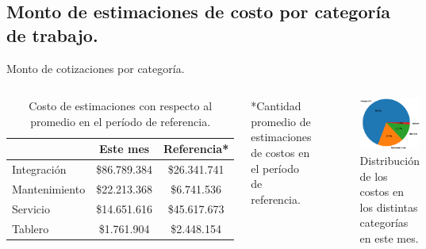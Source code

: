 \documentclass[aspectratio=169,xcolor=dvipsnames]{beamer}
\begin{document}
\subsection{Monto de estimaciones de costo por categoría de trabajo.}
\begin{frame}{Monto de cotizaciones por categoría.}
\begin{columns}[c] 
\begin{table}[h!]
\begin{tabular}{|l|c|c|}\hline
  \rowcolor{MediumBlue} \color{white} & \color{white}Este mes & \color{white}Referencia*  \\\hline
Integración & \$86.789.384 & \$26.341.741 \\
Mantenimiento &\$22.213.368 & \$6.741.536 \\
Servicio &  \$14.651.616 & \$45.617.673 \\
Tablero & \$1.761.904 & \$2.448.154\\\hline
\end{tabular}
\caption{Costo de estimaciones con respecto al promedio en el período de referencia.}
\label{table:costo_promedio_mensual}
\end{table}
\begin{block}{}
    \footnotesize{*Cantidad promedio de estimaciones de costos en el período de referencia.}
\end{block}

 \begin{figure}
     \includegraphics[width=\textwidth]{EPS/servicio.eps}
     \caption{Distribución de los costos en los distintas categorías en este mes.}
    \end{figure}

 \end{columns}
\end{frame}
\end{document}
